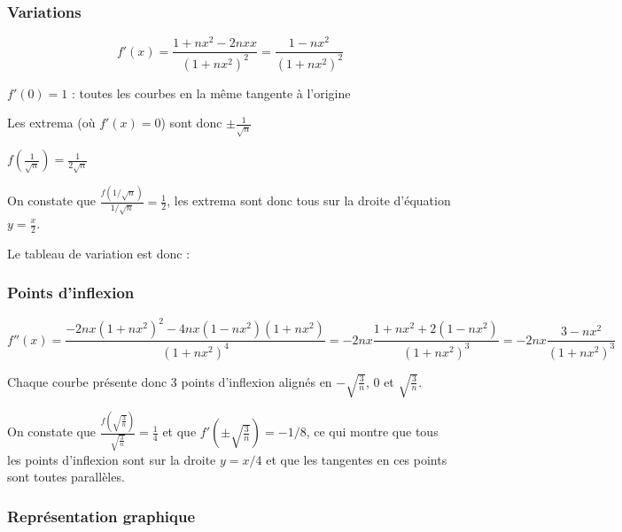 \documentclass[a4paper,10pt]{report}
\begin{document}
\subsubsection*{Variations}

\begin{displaymath}
	f'(x) = \frac{1+nx^2-2nxx}{(1+nx^2)^2}=\frac{1-nx^2}{(1+nx^2)^2}
\end{displaymath}

$f'(0) = 1$ : toutes les courbes en la même tangente à l'origine

Les extrema (où $f'(x)=0$) sont donc $\pm\frac{1}{\sqrt{n}}$

$f(\frac{1}{\sqrt{n}}) = \frac{1}{2\sqrt{n}}$

On constate que $\frac{f(1/\sqrt{n})}{1/\sqrt{n}} = \frac{1}{2}$, les extrema sont donc tous sur la droite
d'équation $y=\frac{x}{2}$.

Le tableau de variation est donc :


\subsubsection*{Points d'inflexion}

\begin{displaymath}
	f''(x) = \frac{-2nx(1+nx^2)^2-4nx(1-nx^2)(1+nx^2)}{(1+nx^2)^4}
	       =-2nx\frac{1+nx^2+2(1-nx^2)}{(1+nx^2)^3}
	       = -2nx\frac{3-nx^2}{(1+nx^2)^3}
\end{displaymath}

Chaque courbe présente donc 3 points d'inflexion alignés en $-\sqrt{\frac{3}{n}}$, $0$ et $\sqrt{\frac{3}{n}}$.

On constate que $\frac{f(\sqrt{\frac{3}{n}})}{\sqrt{\frac{3}{n}}} = \frac{1}{4}$ et que $f'\left({\pm \sqrt{\frac{3}{n}}}\right)=-1/8$, ce qui montre que tous les points d'inflexion sont sur la droite
$y=x/4$ et que les tangentes en ces points sont toutes parallèles.

\subsubsection*{Représentation graphique}
\end{document}
